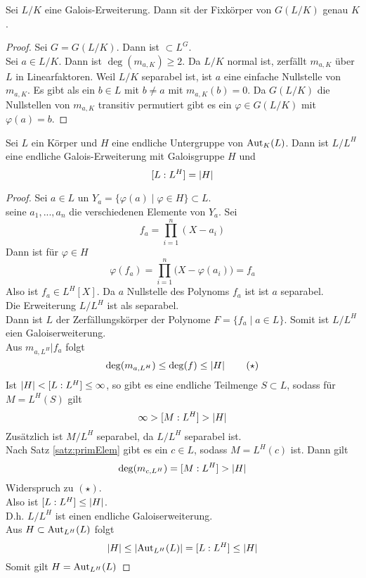 	\begin{satz}
		Sei $L/K$ eine Galois-Erweiterung. Dann sit der Fixkörper von $G(L/K)$ genau $K$.
	\end{satz}
	\begin{proof}
		Sei $G=G(L/K)$. Dann ist $\subset L^G$.\\
		Sei $a\in L/K$. Dann ist $\deg(m_{a,K})\geq 2$. Da $L/K$ normal ist, zerfällt $m_{a,K}$ über $L$ in Linearfaktoren. Weil $L/K$ separabel ist, ist $a$ eine einfache Nullstelle von $m_{a,K}$. Es gibt als ein $b\in L$ mit $b\neq a$ mit $m_{a,K}(b)=0$. Da $G(L/K)$ die Nullstellen von $m_{a,K}$ transitiv permutiert gibt es ein $\varphi\in G(L/K)$ mit $\varphi(a)=b$.
	\end{proof}

	\begin{satz}
		Sei $L$ ein Körper und $H$ eine endliche Untergruppe von $\operatorname{Aut}_K(L)$. Dann ist $L/L^H$ eine endliche Galois-Erweiterung mit Galoisgruppe $H$ und
		\[[L:L^H]=\left|H\right|\]
	\end{satz}
	\begin{proof}
		Sei $a\in L$ un $Y_a=\{\varphi(a)\mid\varphi\in H\}\subset L$.\\
		seine $a_1,...,a_n$ die verschiedenen Elemente von $Y_a$. Sei
		\[f_a=\prod_{i=1}^{n}(X-a_i)\]
		Dann ist für $\varphi\in H$ 
		\[\varphi(f_a)=\prod_{i=1}^{n}\big(X-\varphi(a_i)\big)=f_a\]
		Also ist $f_a\in L^H[X]$. Da $a$ Nullstelle des Polynoms $f_a$ ist ist $a$ separabel.\\
		Die Erweiterung $L/L^H$ ist als separabel.\\
		Dann ist $L$ der Zerfällungskörper der Polynome $F=\{f_a\mid a\in L\}$. Somit ist $L/L^H$ eien Galoiserweiterung.\\
		Aus $m_{a,L^H}| f_a$ folgt 
		\[\deg(m_{a,L^H})\leq \deg(f)\leq \left|H\right|\tag{$\star$}\]
		Ist $\left|H\right|<[L:L^H]\leq\infty$, so gibt es eine endliche Teilmenge $S\subset L$, sodass für $M=L^H(S)$ gilt
		\[\infty>[M:L^H]>\left|H\right|\]
		Zusätzlich ist $M/L^H$ separabel, da $L/L^H$ separabel ist.\\
		Nach Satz \ref{satz:primElem} gibt es ein $c\in L$, sodass $M=L^H(c)$ ist. Dann gilt
		\[\deg(m_{c,L^H})=[M:L^H]>\left|H\right|\]
		Widerspruch zu $(\star)$.\\
		Also ist $[L:L^H]\leq\left|H\right|$.\\
		D.h. $L/L^H$ ist einen endliche Galoiserweiterung.\\
		Aus $H\subset \operatorname{Aut}_{L^H}(L)$ folgt
		\[\left|H\right|\leq\left|\operatorname{Aut}_{L^H}(L)\right|=[L:L^H]\leq\left|H\right|\]
		Somit gilt $H=\operatorname{Aut}_{L^H}(L)$
	\end{proof}

